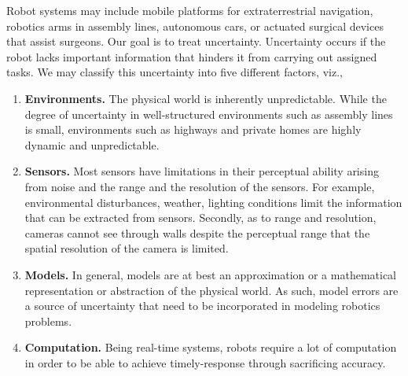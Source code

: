 Robot systems may include mobile platforms for extraterrestrial navigation, robotics arms in assembly lines, autonomous cars, or actuated surgical devices that assist surgeons. Our goal is to treat uncertainty. Uncertainty occurs if the robot lacks important information that hinders it from carrying out assigned tasks. We may classify this uncertainty into five different factors, viz.,
%
\begin{enumerate}
	\item \textbf{Environments.} The physical world is inherently unpredictable. While the degree of uncertainty in well-structured environments such as  assembly lines is small, environments such as highways and private homes are highly dynamic and unpredictable.
	\item \textbf{Sensors.} Most sensors have limitations in their perceptual ability arising from noise and the range and the resolution of the sensors. For example, environmental disturbances, weather, lighting conditions limit the information that can be extracted from sensors. Secondly, as to range and resolution, cameras cannot see through walls despite the perceptual range that the spatial resolution of the camera is limited.
	\item \textbf{Models.} In general, models are at best an approximation or a mathematical representation or abstraction of the physical world. As such, model errors are a source of uncertainty that need to be incorporated in modeling robotics problems.
	\item \textbf{Computation.} Being real-time systems, robots require a lot of computation in order to be able to achieve timely-response through sacrificing accuracy.
\end{enumerate}

